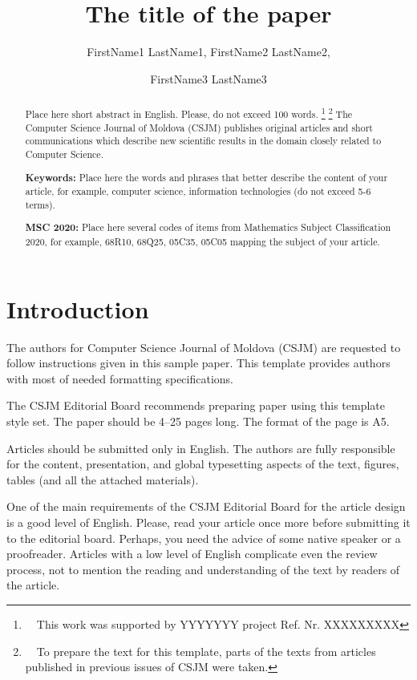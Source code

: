 \documentclass[11pt,a5paper,twoside]{article}
\title{The title of the paper}
\author{FirstName1 LastName1, FirstName2 LastName2, \and FirstName3 LastName3}
\begin{document}
\maketitle

\begin{abstract}
Place here short abstract in English. Please, do not exceed 
100 words.
\footnote{\ \ This work was supported by YYYYYYY project Ref. Nr. XXXXXXXXX} 
\footnote{\ \ To prepare the text for this template, parts of the texts from articles published in previous issues of CSJM were taken.}
The Computer Science Journal of Moldova (CSJM) publishes original articles and short communications which describe new scientific results in the domain closely related to Computer Science.

\textbf{Keywords:} Place here the words and phrases that better describe the content of your article, for example, computer science, information technologies (do not exceed 5-6 terms).

\textbf{MSC 2020:} Place here several codes of items from Mathematics Subject Classification 2020, for example, 68R10, 68Q25, 05C35, 05C05 mapping the subject of your article.
\end{abstract}

\section{Introduction}\label{sect1}
The authors for Computer Science Journal of Moldova (CSJM) are requested to follow instructions given in this sample paper. This template provides authors with most of needed formatting specifications.

The CSJM Editorial Board recommends preparing paper using this template style set. The paper should be 4--25 pages long. The format of the page is A5.

Articles should be submitted only in English. The authors are fully responsible for the content, presentation, and global typesetting aspects of the text, figures, tables (and all the attached materials).

One of the main requirements of the CSJM Editorial Board for the article design is a good level of English. Please, read your article once more before submitting it to the editorial board. Perhaps, you need the advice of some native speaker or a proofreader. Articles with a low level of English complicate even the review process, not to mention the reading and understanding of the text by readers of the article.
\end{document}
